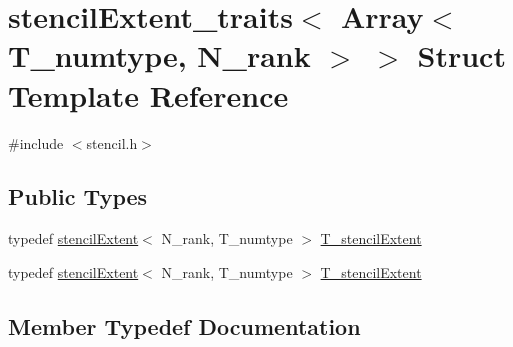 \hypertarget{structstencilExtent__traits_3_01Array_3_01T__numtype_00_01N__rank_01_4_01_4}{}\section{stencil\+Extent\+\_\+traits$<$ Array$<$ T\+\_\+numtype, N\+\_\+rank $>$ $>$ Struct Template Reference}
\label{structstencilExtent__traits_3_01Array_3_01T__numtype_00_01N__rank_01_4_01_4}


{\ttfamily \#include $<$stencil.\+h$>$}

\subsection*{Public Types}
\begin{DoxyCompactItemize}
\item 
typedef \hyperlink{classstencilExtent}{stencil\+Extent}$<$ N\+\_\+rank, T\+\_\+numtype $>$ \hyperlink{structstencilExtent__traits_3_01Array_3_01T__numtype_00_01N__rank_01_4_01_4_a2005d344fd8234669ceae1fe096e1b27}{T\+\_\+stencil\+Extent}
\item 
typedef \hyperlink{classstencilExtent}{stencil\+Extent}$<$ N\+\_\+rank, T\+\_\+numtype $>$ \hyperlink{structstencilExtent__traits_3_01Array_3_01T__numtype_00_01N__rank_01_4_01_4_a2005d344fd8234669ceae1fe096e1b27}{T\+\_\+stencil\+Extent}
\end{DoxyCompactItemize}


\subsection{Member Typedef Documentation}
\hypertarget{structstencilExtent__traits_3_01Array_3_01T__numtype_00_01N__rank_01_4_01_4_a2005d344fd8234669ceae1fe096e1b27}{}
